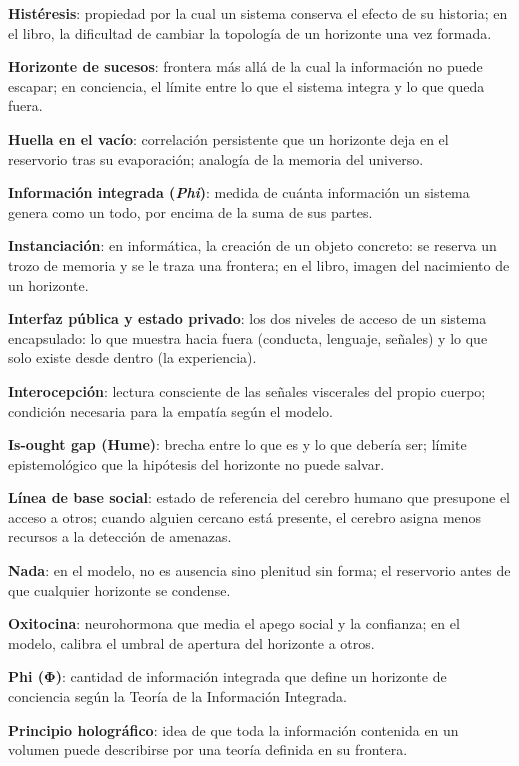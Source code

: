 \glos \textbf{Histéresis}: propiedad por la cual un sistema conserva el efecto de su historia; en el libro, la dificultad de cambiar la topología de un horizonte una vez formada.

\glos \textbf{Horizonte de sucesos}: frontera más allá de la cual la información no puede escapar; en conciencia, el límite entre lo que el sistema integra y lo que queda fuera.

\glos \textbf{Huella en el vacío}: correlación persistente que un horizonte deja en el reservorio tras su evaporación; analogía de la memoria del universo.

\glos \textbf{Información integrada (}\textbf{\emph{Phi}}\textbf{)}: medida de cuánta información un sistema genera como un todo, por encima de la suma de sus partes.

\glos \textbf{Instanciación}: en informática, la creación de un objeto concreto: se reserva un trozo de memoria y se le traza una frontera; en el libro, imagen del nacimiento de un horizonte.

\glos \textbf{Interfaz pública y estado privado}: los dos niveles de acceso de un sistema encapsulado: lo que muestra hacia fuera (conducta, lenguaje, señales) y lo que solo existe desde dentro (la experiencia).

\glos \textbf{Interocepción}: lectura consciente de las señales viscerales del propio cuerpo; condición necesaria para la empatía según el modelo.

\glos \textbf{Is-ought gap (Hume)}: brecha entre lo que es y lo que debería ser; límite epistemológico que la hipótesis del horizonte no puede salvar.

\glos \textbf{Línea de base social}: estado de referencia del cerebro humano que presupone el acceso a otros; cuando alguien cercano está presente, el cerebro asigna menos recursos a la detección de amenazas.

\glos \textbf{Nada}: en el modelo, no es ausencia sino plenitud sin forma; el reservorio antes de que cualquier horizonte se condense.

\glos \textbf{Oxitocina}: neurohormona que media el apego social y la confianza; en el modelo, calibra el umbral de apertura del horizonte a otros.

\glos \textbf{Phi (Φ)}: cantidad de información integrada que define un horizonte de conciencia según la Teoría de la Información Integrada.

\glos \textbf{Principio holográfico}: idea de que toda la información contenida en un volumen puede describirse por una teoría definida en su frontera.

